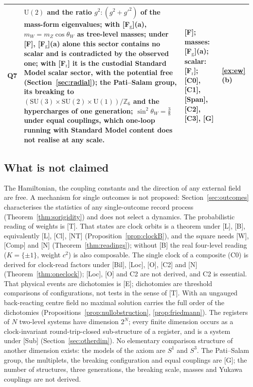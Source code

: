 \documentclass[aps,pra,onecolumn,superscriptaddress,nofootinbib,10pt]{revtex4-2}
\theoremstyle{definition}
\theoremstyle{remark}
\newcommand{\Z}{\mathbb{Z}}
\newcommand{\SU}{\mathrm{SU}}
\newcommand{\U}{\mathrm{U}}
\begin{document}
\begin{table}[h]
\begin{tabular}{@{}p{}p{}p{}p{}@{}}
Q7 & $\U(2)$ and the ratio $g^2:(g^2+g'^2)$ of the mass-form eigenvalues; with [F$_{\mathrm g}$](a), $m_W=m_Z\cos\theta_W$ as tree-level masses; under [F], [F$_{\mathrm g}$](a) alone this sector contains no scalar and is contradicted by the observed one; with [F$_{\mathrm r}$] it is the custodial Standard Model scalar sector, with the potential free (Section~\ref{sec:radial}); the Pati--Salam group, its breaking to $(\SU(3)\times\SU(2)\times\U(1))/\Z_6$ and the hypercharges of one generation; $\sin^2\theta_W=\tfrac38$ under equal couplings, which one-loop running with Standard Model content does not realise at any scale. & [F]; masses: [F$_{\mathrm g}$](a); scalar: [F$_{\mathrm r}$]; [C0], [C1], [Span], [C2], [C3], [G] & \ref{ex:ew}(b)\\
\bottomrule
\end{tabular}
\end{table}

\subsection{What is not claimed}
The Hamiltonian, the coupling constants and the direction of any external field are free.  A
mechanism for single outcomes is not proposed: Section~\ref{sec:outcomes} characterises the statistics of any
single-outcome record process (Theorem~\ref{thm:sorigidity}) and does not select a dynamics.  The probabilistic reading of weights is [T].  That
states are clock orbits is a theorem under [L], [B], equivalently [L], [Cl], [NT]
(Proposition~\ref{prop:clockB}), and the square needs [W], [Comp] and [N] (Theorem~\ref{thm:readings}); without [B] the
real four-level reading ($K=\{\pm1\}$, weight $c^2$) is also composable.  The single clock of a composite (C0) is derived for clock-read factors under [Bil], [Loc], [O], [C2] and
[N] (Theorem~\ref{thm:oneclock}); [Loc], [O] and C2 are not derived, and C2 is essential.  That physical
events are dichotomies is [E]; dichotomies are threshold comparisons of configurations, not tests in
the sense of [T].  With an ungauged back-reacting centre field no maximal solution carries the full order of the
dichotomies (Propositions~\ref{prop:nullobstruction}, \ref{prop:friedmann}).  The registers of $N$ two-level systems have dimension $2^N$; every finite dimension occurs as a
clock-invariant round-trip-closed sub-structure of a register, and is a system under [Sub]
(Section~\ref{sec:otherdim}).  No elementary comparison structure of another dimension exists: the models of
the axiom are $S^1$ and $S^3$.  The Pati--Salam group, the multiplets, the breaking
configuration and equal couplings are [G]; the number of structures, three generations, the
breaking scale, masses and Yukawa couplings are not derived.
\end{document}
